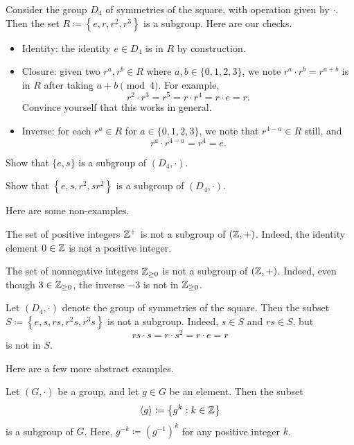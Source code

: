 \documentclass[../main.tex]{subfiles}
\begin{document}
\begin{example}
    Consider the group $D_4$ of symmetries of the square, with operation given by $\cdot$. Then the set $R\coloneqq\left\{e,r,r^2,r^3\right\}$ is a subgroup. Here are our checks.
    \begin{itemize}
        \item Identity: the identity $e\in D_4$ is in $R$ by construction.
        \item Closure: given two $r^a,r^b\in R$ where $a,b\in\{0,1,2,3\}$, we note $r^a\cdot r^b=r^{a+b}$ is in $R$ after taking $a+b\pmod4$. For example,
        \[r^2\cdot r^3=r^5=r\cdot r^4=r\cdot e=r.\]
        Convince yourself that this works in general.
        \item Inverse: for each $r^a\in R$ for $a\in\{0,1,2,3\}$, we note that $r^{4-a}\in R$ still, and
        \[r^a\cdot r^{4-a}=r^4=e.\]
    \end{itemize}
\end{example}
\begin{exe}
    Show that $\{e,s\}$ is a subgroup of $(D_4,\cdot)$.
\end{exe}
\begin{exe} \label{exe:klein-four}
    Show that $\left\{e,s,r^2,sr^2\right\}$ is a subgroup of $(D_4,\cdot)$.
\end{exe}
Here are some non-examples.
\begin{nex}
    The set of positive integers $\mathbb Z^+$ is not a subgroup of $(\mathbb Z,+)$. Indeed, the identity element $0\in\mathbb Z$ is not a positive integer.
\end{nex}
\begin{nex}
    The set of nonnegative integers $\mathbb Z_{\ge0}$ is not a subgroup of $(\mathbb Z,+)$. Indeed, even though $3\in\mathbb Z_{\ge0}$, the inverse $-3$ is not in $\mathbb Z_{\ge0}$.
\end{nex}
\begin{nex}
    Let $(D_4,\cdot)$ denote the group of symmetries of the square. Then the subset $S\coloneqq\left\{e,s,rs,r^2s,r^3s\right\}$ is not a subgroup. Indeed, $s\in S$ and $rs\in S$, but
    \[rs\cdot s=r\cdot s^2=r\cdot e=r\]
    is not in $S$.
\end{nex}
Here are a few more abstract examples.
\begin{proposition} \label{prop:cyclic-subgroup}
    Let $(G,\cdot)$ be a group, and let $g\in G$ be an element. Then the subset
    \[\langle g\rangle\coloneqq\left\{g^k:k\in\mathbb Z\right\}\]
    is a subgroup of $G$. Here, $g^{-k}\coloneqq\left(g^{-1}\right)^k$ for any positive integer $k$.
\end{proposition}
\end{document}
